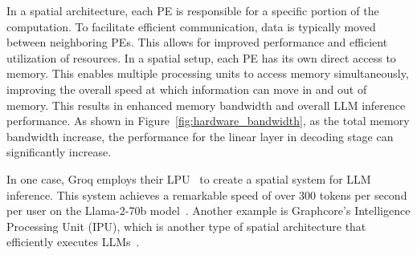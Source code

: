 In a spatial architecture, each PE is responsible for a specific portion of the computation. To facilitate efficient communication, data is typically moved between neighboring PEs. This allows for improved performance and efficient utilization of resources.
In a spatial setup, each PE has its own direct access to memory. This enables multiple processing units to access memory simultaneously, improving the overall speed at which information can move in and out of memory. This results in enhanced memory bandwidth and overall LLM inference performance.
As shown in Figure~\ref{fig:hardware_bandwidth}, as the total memory bandwidth increase, the performance for the linear layer in decoding stage can significantly increase.

In one case, Groq employs their LPU~\citep{abts2022groq_lpu} to create a spatial system for LLM inference. This system achieves a remarkable speed of over 300 tokens per second per user on the Llama-2-70b model~\citep{groq2023lpu_report}. Another example is Graphcore's Intelligence Processing Unit (IPU), which is another type of spatial architecture that efficiently executes LLMs~\citep{graphcore_gradient_huggingface}.






